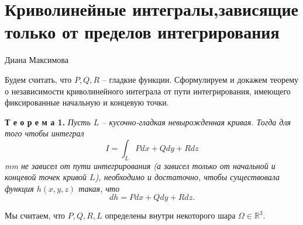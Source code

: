 \documentclass[12pt,titlepage]{report}
\begin{document}
\chapter{Криволинейные интегралы,зависящие только от пределов интегрирования}
\centerline{Диана Максимова}
\vskip 5mm
Будем считать, что $P,Q,R$ -- гладкие функции. Сформулируем и докажем теорему о независимости криволинейного интеграла от пути интегрирования, имеющего фиксированные начальную и концевую точки.
\par\textbf{Т е о р е м а 1.} \textit{ Пусть $L$ -- кусочно-гладкая невырожденная кривая. Тогда для того чтобы интеграл
\vskip 5mm
$$I=\int_L{Pdx+Qdy+Rdz}$$
 mm
не зависел от пути интегрирования (а зависел только от начальной и концевой точек кривой $L$), необходимо и достаточно, чтобы существовала функция $h(x,y,z)$ такая, что }
\vskip 5mm
$$dh=Pdx+Qdy+Rdz.$$
\vskip 5mm

Мы считаем, что $P,Q,R,L$ определены внутри некоторого шара $\Omega\in\mathbb{R}^3$.
\end{document}
